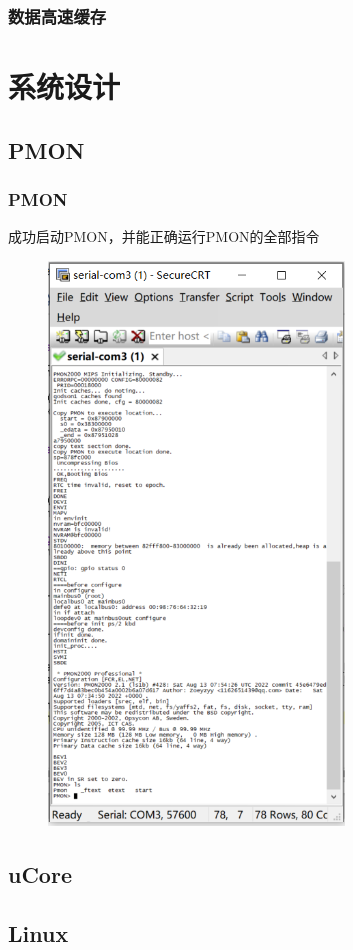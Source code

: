 \documentclass{beamer}
\begin{document}
\begin{frame}
    \frametitle{数据高速缓存}
\end{frame}

\section{系统设计}

\subsection{PMON}

\begin{frame}
    \frametitle{PMON}

    \begin{minipage}[c]{0.4\linewidth}
        成功启动PMON，并能正确运行PMON的全部指令
    \end{minipage}
    \hfill
    \begin{minipage}{0.5\linewidth}
        \begin{figure}
            \centering
            \includegraphics[width=0.7\textwidth]{pic/PMON.png}
        \end{figure}
    \end{minipage}

\end{frame}

\subsection{uCore}

\subsection{Linux}
\end{document}
